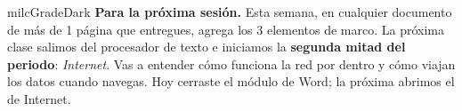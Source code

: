 \documentclass[11pt,letterpaper]{article}
\begin{document}
\begin{infoband}{milcGradeDark}
\textbf{Para la próxima sesión.} Esta semana, en cualquier documento de más de 1 página que entregues, agrega los 3 elementos de marco. La próxima clase salimos del procesador de texto e iniciamos la \textbf{segunda mitad del periodo}: \emph{Internet}. Vas a entender cómo funciona la red por dentro y cómo viajan los datos cuando navegas. Hoy cerraste el módulo de Word; la próxima abrimos el de Internet.
\end{infoband}
\end{document}
